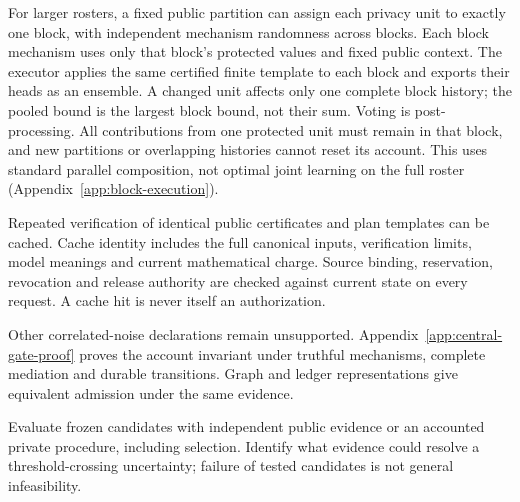 For larger rosters, a fixed public partition can assign each privacy unit
to exactly one block, with independent mechanism randomness across
blocks. Each block mechanism uses only that block's protected values
and fixed public context. The executor applies the same certified finite
template to each block and exports their heads as an ensemble. A changed unit affects
only one complete block history; the pooled bound is the largest block
bound, not their sum. Voting is post-processing. All contributions from
one protected unit must remain in that block, and new partitions or
overlapping histories cannot reset its account. This uses standard
parallel composition, not optimal joint learning on the full roster
(Appendix~\ref{app:block-execution}).

Repeated verification of identical public certificates and plan templates
can be cached. Cache identity includes the full canonical inputs,
verification limits, model meanings and current mathematical charge.
Source binding, reservation, revocation and release authority are checked
against current state on every request. A cache hit is never itself an
authorization.

Other correlated-noise declarations remain unsupported.
Appendix~\ref{app:central-gate-proof} proves the account invariant under
truthful mechanisms, complete mediation and durable transitions. Graph
and ledger representations give equivalent admission under the same evidence.

Evaluate frozen candidates with independent public evidence or an
accounted private procedure, including selection. Identify what evidence
could resolve a threshold-crossing uncertainty; failure of tested
candidates is not general infeasibility.

